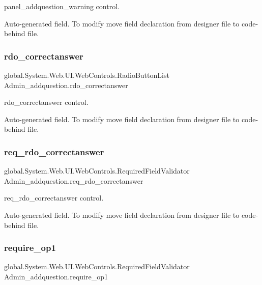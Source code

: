 panel\+\_\+addquestion\+\_\+warning control. 

Auto-\/generated field. To modify move field declaration from designer file to code-\/behind file. \mbox{\label{class_admin__addquestion_a255482c92326bf804f50312d380bd982}} 
\subsubsection{\texorpdfstring{rdo\_correctanswer}{rdo\_correctanswer}}
{\footnotesize\ttfamily global.\+System.\+Web.\+U\+I.\+Web\+Controls.\+Radio\+Button\+List Admin\+\_\+addquestion.\+rdo\+\_\+correctanswer\hspace{0.3cm}{\ttfamily [protected]}}



rdo\+\_\+correctanswer control. 

Auto-\/generated field. To modify move field declaration from designer file to code-\/behind file. \mbox{\label{class_admin__addquestion_ad956413c12ca17179e824c18fe8c88b5}} 
\subsubsection{\texorpdfstring{req\_rdo\_correctanswer}{req\_rdo\_correctanswer}}
{\footnotesize\ttfamily global.\+System.\+Web.\+U\+I.\+Web\+Controls.\+Required\+Field\+Validator Admin\+\_\+addquestion.\+req\+\_\+rdo\+\_\+correctanswer\hspace{0.3cm}{\ttfamily [protected]}}



req\+\_\+rdo\+\_\+correctanswer control. 

Auto-\/generated field. To modify move field declaration from designer file to code-\/behind file. \mbox{\label{class_admin__addquestion_a05e73dcf265c906347af369f38402e7a}} 
\subsubsection{\texorpdfstring{require\_op1}{require\_op1}}
{\footnotesize\ttfamily global.\+System.\+Web.\+U\+I.\+Web\+Controls.\+Required\+Field\+Validator Admin\+\_\+addquestion.\+require\+\_\+op1\hspace{0.3cm}{\ttfamily [protected]}}



